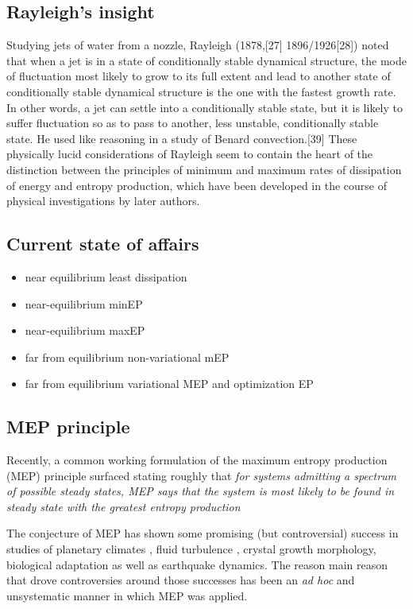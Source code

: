\documentclass[a4paper,12pt]{article}
\begin{document}
\subsection{Rayleigh's insight}
Studying jets of water from a nozzle, Rayleigh (1878,[27] 1896/1926[28]) noted that when a jet is in a state of conditionally stable dynamical structure, the mode of fluctuation most likely to grow to its full extent and lead to another state of conditionally stable dynamical structure is the one with the fastest growth rate. In other words, a jet can settle into a conditionally stable state, but it is likely to suffer fluctuation so as to pass to another, less unstable, conditionally stable state. He used like reasoning in a study of Benard convection.[39] These physically lucid considerations of Rayleigh seem to contain the heart of the distinction between the principles of minimum and maximum rates of dissipation of energy and entropy production, which have been developed in the course of physical investigations by later authors.

\subsection{Current state of affairs}
\begin{itemize}
	\item near equilibrium least dissipation
	\item near-equilibrium minEP
	\item near-equilibrium maxEP
	\item far from equilibrium non-variational mEP
	\item far from equilibrium variational MEP and optimization EP
\end{itemize}


\subsection{MEP principle}

Recently, a common working formulation of the maximum entropy production (MEP) principle surfaced stating roughly that \textit{for systems admitting a spectrum of possible steady states, MEP says that the system is most likely to be found in steady state  with the greatest entropy production}

The conjecture of MEP has shown some promising (but controversial) success in studies of planetary climates \cite{Paltridge:2007jf}, fluid turbulence \cite{Ozawa:2003jt} \cite{MALKUS:2003ix}, crystal growth morphology, biological adaptation as well as earthquake dynamics. %
The reason main reason that drove controversies around those successes has been an \textit{ad hoc} and unsystematic manner in which MEP was applied.
\end{document}
